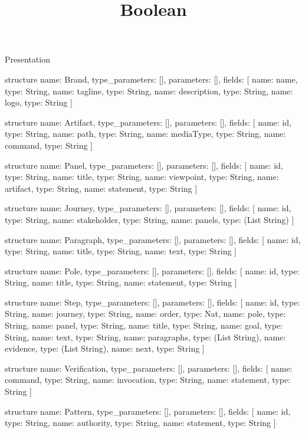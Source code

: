 \begin{lexlean}{Presentation}
\title{Boolean}
\begin{semanticmodule}
structure{
  name: Brand,
  type_parameters: [],
  parameters: [],
  fields: [
    {name: name, type: String},
    {name: tagline, type: String},
    {name: description, type: String},
    {name: logo, type: String}
  ]
}

structure{
  name: Artifact,
  type_parameters: [],
  parameters: [],
  fields: [
    {name: id, type: String},
    {name: path, type: String},
    {name: mediaType, type: String},
    {name: command, type: String}
  ]
}

structure{
  name: Panel,
  type_parameters: [],
  parameters: [],
  fields: [
    {name: id, type: String},
    {name: title, type: String},
    {name: viewpoint, type: String},
    {name: artifact, type: String},
    {name: statement, type: String}
  ]
}

structure{
  name: Journey,
  type_parameters: [],
  parameters: [],
  fields: [
    {name: id, type: String},
    {name: stakeholder, type: String},
    {name: panels, type: (List String)}
  ]
}

structure{
  name: Paragraph,
  type_parameters: [],
  parameters: [],
  fields: [
    {name: id, type: String},
    {name: title, type: String},
    {name: text, type: String}
  ]
}

structure{
  name: Pole,
  type_parameters: [],
  parameters: [],
  fields: [
    {name: id, type: String},
    {name: title, type: String},
    {name: statement, type: String}
  ]
}

structure{
  name: Step,
  type_parameters: [],
  parameters: [],
  fields: [
    {name: id, type: String},
    {name: journey, type: String},
    {name: order, type: Nat},
    {name: pole, type: String},
    {name: panel, type: String},
    {name: title, type: String},
    {name: goal, type: String},
    {name: text, type: String},
    {name: paragraphs, type: (List String)},
    {name: evidence, type: (List String)},
    {name: next, type: String}
  ]
}

structure{
  name: Verification,
  type_parameters: [],
  parameters: [],
  fields: [
    {name: command, type: String},
    {name: invocation, type: String},
    {name: statement, type: String}
  ]
}

structure{
  name: Pattern,
  type_parameters: [],
  parameters: [],
  fields: [
    {name: id, type: String},
    {name: authority, type: String},
    {name: statement, type: String}
  ]
}


\end{semanticmodule}
\end{lexlean}
